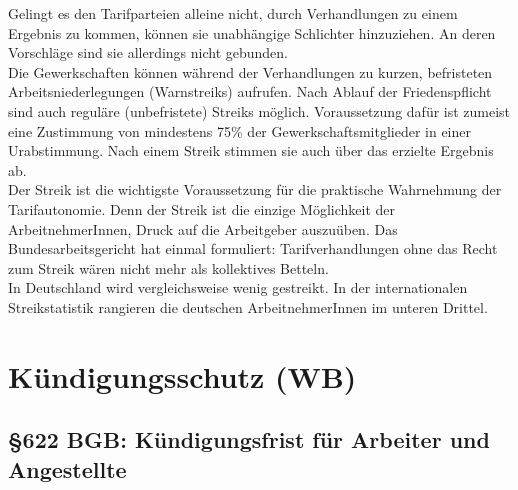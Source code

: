 \documentclass[a4paper, 12pt]{report}
\begin{document}
Gelingt es den Tarifparteien alleine nicht, durch Verhandlungen zu einem 
Ergebnis zu kommen, können sie unabhängige Schlichter hinzuziehen. An deren 
Vorschläge sind sie allerdings nicht gebunden. \\

Die Gewerkschaften können während der Verhandlungen zu kurzen, befristeten 
Arbeitsniederlegungen (Warnstreiks) aufrufen. Nach Ablauf der Friedenspflicht 
sind auch reguläre (unbefristete) Streiks möglich. Voraussetzung dafür ist 
zumeist eine Zustimmung von mindestens 75\% der Gewerkschaftsmitglieder in einer
Urabstimmung. Nach einem Streik stimmen sie auch über das erzielte Ergebnis 
ab. \\

Der Streik ist die wichtigste Voraussetzung für die praktische Wahrnehmung der 
\glqq Tarifautonomie\grqq{}. Denn der Streik ist die einzige Möglichkeit der 
ArbeitnehmerInnen, Druck auf die Arbeitgeber auszuüben. Das Bundesarbeitsgericht
hat einmal formuliert: \glqq Tarifverhandlungen ohne das Recht zum Streik wären
nicht mehr als kollektives Betteln\grqq{}. \\

In Deutschland wird vergleichsweise wenig gestreikt. In der internationalen 
Streikstatistik rangieren die deutschen ArbeitnehmerInnen im unteren Drittel. 

\section{Kündigungsschutz (WB)}

\subsection{\S 622 BGB: Kündigungsfrist für Arbeiter und Angestellte}
\end{document}
